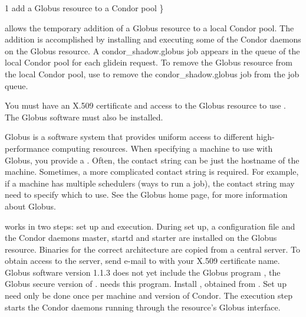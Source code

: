 \begin{ManPage}{\label{man-condor-glidein}}{1}
{add a Globus resource to a Condor pool}
\Synopsis {}
 \} \Bar {}


\Description

 allows the temporary addition of a Globus resource to
a local Condor pool.
The addition is accomplished by installing and executing some of the Condor
daemons on the Globus resource.
A condor\_shadow.globus job appears in the queue of the local
Condor pool for each glidein request.
To remove the Globus resource from the local Condor pool,
use  to remove the condor\_shadow.globus job from
the job queue.

You must have an X.509 certificate and access
to the Globus resource to use .
The Globus software must also be installed.

Globus is a software system that provides uniform access to
different high-performance computing resources.
When specifying a machine to use with Globus,
you provide a .
Often, the contact string can be just the hostname of the machine.
Sometimes, a more complicated contact string is required.
For example, if a machine has multiple schedulers (ways to run a job),
the contact string may need to specify which to use.
See the Globus home page,  for more
information about Globus.

 works in two steps: set up and execution.
During set up, a configuration file and the Condor daemons
master, startd and starter are installed on the Globus
resource.
Binaries for the correct architecture are copied from a central server.
To obtain access to the server,
send
e-mail to  with your X.509
certificate name.
Globus software version 1.1.3 does not yet include
the Globus program ,
the Globus secure version of .
 needs this program.
Install , obtained from
.
Set up need only be done once per machine and version of Condor.
The execution step starts the Condor daemons running through
the resource's Globus interface.


\end{ManPage}

